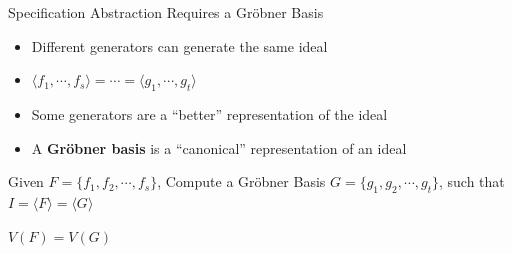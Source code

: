 \documentclass[xcolor=dvipsnames]{beamer}
\begin{document}
\begin{frame}{\large {Specification Abstraction Requires a Gr\"obner Basis}}
\vspace{-0.2in}

\begin{itemize}
\item Different generators can generate the same ideal
\item $\langle f_1,\cdots,f_s \rangle=\cdots=\langle g_1,\cdots,g_t
  \rangle$
\item Some generators are a ``better'' representation of the ideal
\item A {\bf Gr\"obner basis} is a ``canonical'' representation of an ideal
\end{itemize}

Given $F = \{f_1, f_2,\cdots, f_s\}$, Compute a Gr\"obner Basis $G =
\{g_1,g_2,\cdots,g_t\}$, such that $I = \langle F \rangle = \langle G \rangle$

\begin{center}
$V(F)=V(G)$
\end{center}


\end{frame}

\end{document}
